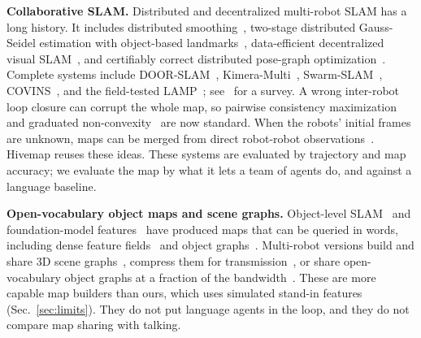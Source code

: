 \documentclass[conference]{IEEEtran}
\begin{document}
\textbf{Collaborative SLAM.}
Distributed and decentralized multi-robot SLAM has a long history.
It includes distributed smoothing~\cite{cunningham2010ddfsam}, two-stage distributed Gauss-Seidel estimation with object-based landmarks~\cite{choudhary2016icra,choudhary2017ijrr}, data-efficient decentralized visual SLAM~\cite{cieslewski2018icra}, and certifiably correct distributed pose-graph optimization~\cite{tian2021dc2pgo}.
Complete systems include DOOR-SLAM~\cite{lajoie2020doorslam}, Kimera-Multi~\cite{chang2021kimeramulti,tian2022kimeramulti}, Swarm-SLAM~\cite{lajoie2024swarmslam}, COVINS~\cite{schmuck2021covins}, and the field-tested LAMP~\cite{ebadi2020lamp,chang2022lamp2}; see~\cite{lajoie2022survey} for a survey.
A wrong inter-robot loop closure can corrupt the whole map, so pairwise consistency maximization~\cite{mangelson2018pcm} and graduated non-convexity~\cite{yang2020gnc} are now standard.
When the robots' initial frames are unknown, maps can be merged from direct robot-robot observations~\cite{zhou2006rendezvous,howard2006ijrr}.
Hivemap reuses these ideas.
These systems are evaluated by trajectory and map accuracy; we evaluate the map by what it lets a team of agents do, and against a language baseline.

\textbf{Open-vocabulary object maps and scene graphs.}
Object-level SLAM~\cite{salasmoreno2013slampp,nicholson2019quadricslam,yang2019cubeslam} and foundation-model features~\cite{radford2021clip,kirillov2023sam,ravi2025sam2} have produced maps that can be queried in words, including dense feature fields~\cite{peng2023openscene,jatavallabhula2023conceptfusion} and object graphs~\cite{gu2024conceptgraphs,werby2024hovsg,maggio2024clio}.
Multi-robot versions build and share 3D scene graphs~\cite{chang2023hydramulti}, compress them for transmission~\cite{chang2023dlite}, or share open-vocabulary object graphs at a fraction of the bandwidth~\cite{gu2025mrcographs}.
These are more capable map builders than ours, which uses simulated stand-in features (Sec.~\ref{sec:limits}).
They do not put language agents in the loop, and they do not compare map sharing with talking.
\end{document}
